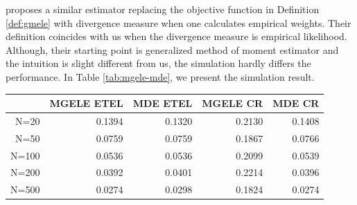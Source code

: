 \documentclass[oneside,english]{amsbook}
\numberwithin{section}{chapter}
\numberwithin{equation}{section}
\numberwithin{figure}{section}
\theoremstyle{plain}
\theoremstyle{plain}
\theoremstyle{definition}
\theoremstyle{plain}
\theoremstyle{plain}
\theoremstyle{remark}
\theoremstyle{definition}
\theoremstyle{definition}
\begin{document}
\citet{newey2004higher} proposes a similar estimator replacing the
objective function in Definition \ref{def:gmele} with divergence
measure when one calculates empirical weights. Their definition coincides
with us when the divergence measure is empirical likelihood. Although,
their starting point is generalized method of moment estimator and
the intuition is slight different from us, the simulation hardly differs
the performance. In Table \ref{tab:mgele-mde}, we present the simulation
result. 
\begin{table}
\centering
\begin{tabular}{rrrrr}
  \hline
 & MGELE ETEL & MDE ETEL & MGELE CR & MDE CR \\ 
  \hline
N=20 & 0.1394 & 0.1320 & 0.2130 & 0.1408 \\
   N=50 & 0.0759 & 0.0759 & 0.1867 & 0.0766 \\
   N=100 & 0.0536 & 0.0536 & 0.2099 & 0.0539 \\
   N=200 & 0.0392 & 0.0401 & 0.2214 & 0.0396 \\
   N=500 & 0.0274 & 0.0298 & 0.1824 & 0.0274 \\
    \hline
\end{tabular}
\end{table}
\end{document}
